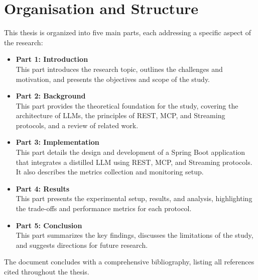 \chapter{Organisation and Structure}
This thesis is organized into five main parts, each addressing a specific aspect of the research:

\begin{itemize}
    \item \textbf{Part 1: Introduction} \\
    This part introduces the research topic, outlines the challenges and motivation, and presents the objectives and scope of the study.

    \item \textbf{Part 2: Background} \\
    This part provides the theoretical foundation for the study, covering the architecture of LLMs, the principles of REST, MCP, and Streaming protocols, and a review of related work.

    \item \textbf{Part 3: Implementation} \\
    This part details the design and development of a Spring Boot application that integrates a distilled LLM using REST, MCP, and Streaming protocols. It also describes the metrics collection and monitoring setup.

    \item \textbf{Part 4: Results} \\
    This part presents the experimental setup, results, and analysis, highlighting the trade-offs and performance metrics for each protocol.

    \item \textbf{Part 5: Conclusion} \\
    This part summarizes the key findings, discusses the limitations of the study, and suggests directions for future research.
\end{itemize}

The document concludes with a comprehensive bibliography, listing all references cited throughout the thesis.